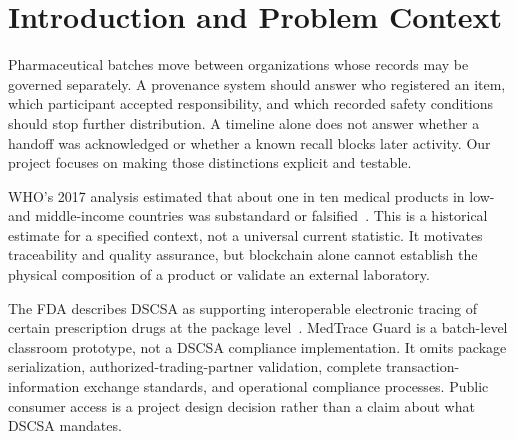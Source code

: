 \begin{abstract}
MedTrace Guard is an implemented educational prototype for pharmaceutical batch provenance. It combines wallet roles, recipient-accepted handoffs, quantity accounting, recall and expiry checks, persistent condition holds, and off-chain certificate integrity. This report documents its architecture, trust assumptions, and reproducible evaluation. Solidity compilation, 68 automated tests, the React production build, browser lifecycle checks, and comparative local benchmarks passed. Actual MetaMask signing completed manufacturer--distributor--pharmacy custody on Polygon Amoy. A public temperature hold blocked dispensing without changing state, and a pinned IPFS certificate retrieved through a public gateway matched its on-chain SHA-256. All 75 acceptance checks have passing evidence, including user-confirmed phone lookup. The team must review this draft and complete report-layout and course-submission requirements.
\end{abstract}

\section{Introduction and Problem Context}
Pharmaceutical batches move between organizations whose records may be governed separately. A provenance system should answer who registered an item, which participant accepted responsibility, and which recorded safety conditions should stop further distribution. A timeline alone does not answer whether a handoff was acknowledged or whether a known recall blocks later activity. Our project focuses on making those distinctions explicit and testable.

WHO's 2017 analysis estimated that about one in ten medical products in low- and middle-income countries was substandard or falsified~\cite{who}. This is a historical estimate for a specified context, not a universal current statistic. It motivates traceability and quality assurance, but blockchain alone cannot establish the physical composition of a product or validate an external laboratory.

The FDA describes DSCSA as supporting interoperable electronic tracing of certain prescription drugs at the package level~\cite{fda}. MedTrace Guard is a batch-level classroom prototype, not a DSCSA compliance implementation. It omits package serialization, authorized-trading-partner validation, complete transaction-information exchange standards, and operational compliance processes. Public consumer access is a project design decision rather than a claim about what DSCSA mandates.

